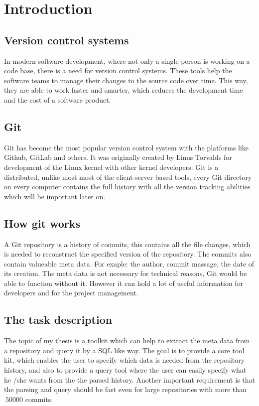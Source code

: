 \chapter{Introduction}
\label{ch:intro}

\section{Version control systems}
In modern software development, where not only a single person is working on a code base, there is a need for version control systems. 
These tools help the software teams to manage their changes to the source code over time. 
This way, they are able to work faster and smarter, which reduces the development time and the cost of a software product.

\section{Git}
Git has become the most popular version control system with the platforms like Github\cite{dijkstra1979goto}, GitLab\cite{Gitlab} and others. 
It was originally created by Linus Torvalds \cite{linus} for development of the Linux kernel with other kernel developers. 
Git is a distributed, unlike most most of the client-server based tools, every Git directory on every computer contains the full history with all the version tracking abilities which will be important later on.

\section{How git works}
A Git repository is a history of commits, this contains all the file changes, which is needed to reconstruct the specified version of the repository. 
The commits also contain valueable meta data. For exaple: the author, commit massage, the date of its creation.
The meta data is not necessary for technical reasons, Git would be able to function without it. 
However it can hold a lot of useful information for developers and for the project management.

\section{The task description}
The topic of my thesis is a toolkit which can help to extract the meta data from a repository and query it by a SQL like way. 
The goal is to provide a core tool kit, which enables the user to specify which data is needed from the repository history, and also  to provide a query tool where the user can easily specify what he /she wants from the the parsed history. 
Another important requirement is that the parsing and query should be fast even for large repositories with more than \(~50000\) commits.

